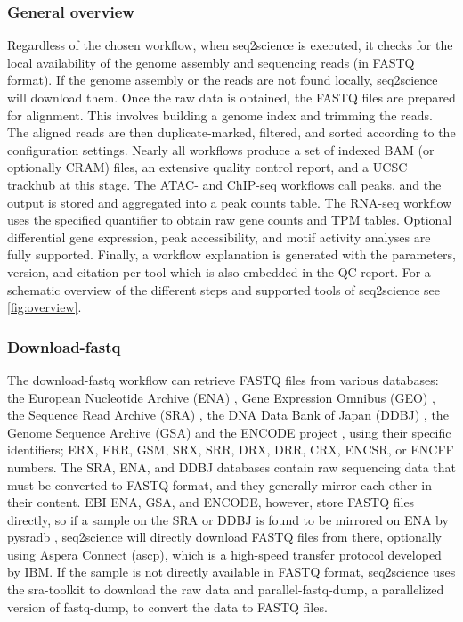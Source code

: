 \subsubsection{General overview}

Regardless of the chosen workflow, when seq2science is executed, it checks for the local availability of the genome assembly and sequencing reads (in FASTQ format). If the genome assembly or the reads are not found locally, seq2science will download them. Once the raw data is obtained, the FASTQ files are prepared for alignment. This involves  building a genome index and trimming the reads. The aligned reads are then duplicate-marked, filtered, and sorted according to the configuration settings. Nearly all workflows produce a set of indexed BAM (or optionally CRAM) files, an extensive quality control report, and a UCSC trackhub at this stage. The ATAC- and ChIP-seq workflows call peaks, and the output is stored and aggregated into a peak counts table. The RNA-seq workflow uses the specified quantifier to obtain raw gene counts and TPM tables. Optional differential gene expression, peak accessibility, and motif activity analyses are fully supported. Finally, a workflow explanation is generated with the parameters, version, and citation per tool which is also embedded in the QC report. For a schematic overview of the different steps and supported tools of seq2science see \autoref{fig:overview}. 

\subsubsection{Download-fastq}

The download-fastq workflow can retrieve FASTQ files from various databases: the European Nucleotide Archive (ENA) \cite{ENA}, Gene Expression Omnibus (GEO) \cite{GEO}, the Sequence Read Archive (SRA) \cite{SRA}, the DNA Data Bank of Japan (DDBJ) \cite{DDBJ}, the Genome Sequence Archive (GSA) \cite{GSA} and the ENCODE project \cite{Luo2019}, using their specific identifiers; ERX, ERR, GSM, SRX, SRR, DRX, DRR, CRX, ENCSR, or ENCFF numbers. The SRA, ENA, and DDBJ databases contain raw sequencing data that must be converted to FASTQ format, and they generally mirror each other in their content. EBI ENA, GSA, and ENCODE, however, store FASTQ files directly, so if a sample on the SRA or DDBJ is found to be mirrored on ENA by pysradb \cite{pysradb}, seq2science will directly download FASTQ files from there, optionally using Aspera Connect (ascp), which is a high-speed transfer protocol developed by IBM. If the sample is not directly available in FASTQ format, seq2science uses the sra-toolkit \cite{SRA} to download the raw data and parallel-fastq-dump, a parallelized version of fastq-dump, to convert the data to FASTQ files.

